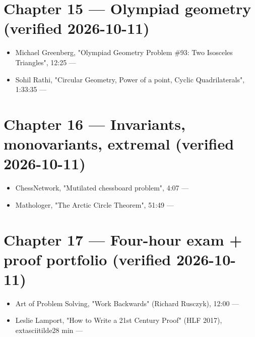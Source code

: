 \section*{Chapter 15 --- Olympiad geometry (verified 2026-10-11)}
\begin{itemize}\setlength\itemsep{2pt}
  \item Michael Greenberg, "Olympiad Geometry Problem \#93: Two Isosceles Triangles", 12:25 ---
  \item Sohil Rathi, "Circular Geometry, Power of a point, Cyclic Quadrilaterals", 1:33:35 ---
\end{itemize}

\section*{Chapter 16 --- Invariants, monovariants, extremal (verified 2026-10-11)}
\begin{itemize}\setlength\itemsep{2pt}
  \item ChessNetwork, "Mutilated chessboard problem", 4:07 ---
  \item Mathologer, "The Arctic Circle Theorem", 51:49 ---
\end{itemize}

\section*{Chapter 17 --- Four-hour exam + proof portfolio (verified 2026-10-11)}
\begin{itemize}\setlength\itemsep{2pt}
  \item Art of Problem Solving, "Work Backwards" (Richard Rusczyk), 12:00 ---
  \item Leslie Lamport, "How to Write a 21st Century Proof" (HLF 2017), 	extasciitilde{}28 min ---
\end{itemize}

